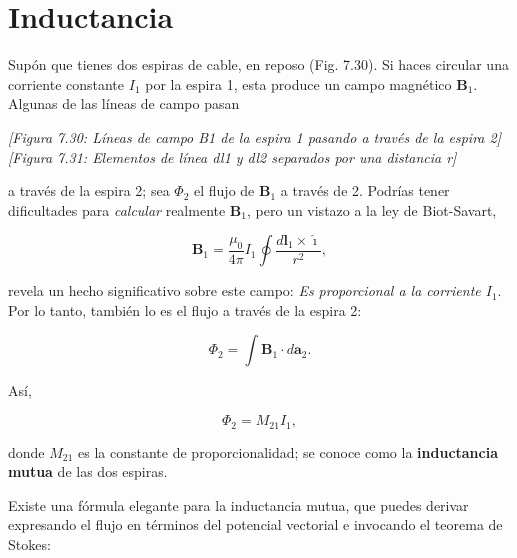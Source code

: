 \documentclass[12pt,a4paper]{report}
\newcommand{\esp}{\vspace{0.5cm}}
\begin{document}
	\section{Inductancia}
	
	Supón que tienes dos espiras de cable, en reposo (Fig. 7.30). Si haces circular una corriente constante $I_1$ por la espira 1, esta produce un campo magnético $\mathbf{B}_1$. Algunas de las líneas de campo pasan
	
	\esp
	
	\begin{center}
		\textit{[Figura 7.30: Líneas de campo B1 de la espira 1 pasando a través de la espira 2]} \\
		\textit{[Figura 7.31: Elementos de línea dl1 y dl2 separados por una distancia r]}
	\end{center}
	
	\esp
	
	a través de la espira 2; sea $\Phi_2$ el flujo de $\mathbf{B}_1$ a través de 2. Podrías tener dificultades para \textit{calcular} realmente $\mathbf{B}_1$, pero un vistazo a la ley de Biot-Savart,
	
	\esp
	
	\begin{equation}
		\mathbf{B}_1 = \frac{\mu_0}{4\pi} I_1 \oint \frac{d\mathbf{l}_1 \times \hat{\imath}}{r^2},
	\end{equation}
	
	\esp
	
	revela un hecho significativo sobre este campo: \textit{Es proporcional a la corriente $I_1$}. Por lo tanto, también lo es el flujo a través de la espira 2:
	
	\esp
	
	\begin{equation}
		\Phi_2 = \int \mathbf{B}_1 \cdot d\mathbf{a}_2.
	\end{equation}
	
	\esp
	
	\noindent Así,
	
	\esp
	
	\begin{equation}
		\Phi_2 = M_{21} I_1, \tag{7.22}
	\end{equation}
	
	\esp
	
	donde $M_{21}$ es la constante de proporcionalidad; se conoce como la \textbf{inductancia mutua} de las dos espiras.
	
	\esp
	
	Existe una fórmula elegante para la inductancia mutua, que puedes derivar expresando el flujo en términos del potencial vectorial e invocando el teorema de Stokes:
	
\end{document}
